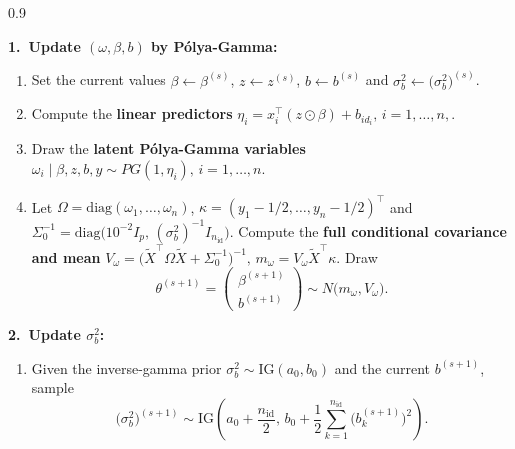 \documentclass[10pt,a4paper]{article}
\begin{document}
\begin{algobox}
\begingroup
\small
\begin{spacing}{0.9}

\noindent\textbf{1.\ Update $(\omega,\beta,b)$ by P\'olya-Gamma:}
\begin{enumerate}[itemsep=2pt, topsep=2pt, leftmargin=*]
  \item Set the current values
        $\beta \leftarrow \beta^{(s)}$,
        $z \leftarrow z^{(s)}$,
        $b \leftarrow b^{(s)}$ and
        $\sigma_b^2 \leftarrow \bigl(\sigma_b^2\bigr)^{(s)}$.
  \item Compute the \textbf{linear predictors} $\eta_i
      = x_i^\top (z \odot \beta) + b_{id_i},
      \, i=1,\dots,n,
    $.
  \item Draw the \textbf{latent P\'olya-Gamma variables} $\omega_i \mid \beta,z,b,y \sim PG(1, \eta_i), \, i=1,\dots,n.$
  \item Let $\Omega = \mathrm{diag}(\omega_1,\dots,\omega_n)$, $\kappa = (y_1 - 1/2,\dots,y_n - 1/2)^\top$ and $\Sigma_0^{-1}= \mathrm{diag}\!\bigl(
               10^{-2} I_p,\,
               (\sigma_b^2)^{-1} I_{n_{\mathrm{id}}}
            \bigr)$.
        Compute the \textbf{full conditional covariance and mean} $V_\omega
          = \bigl(\tilde X^\top \Omega \tilde X + \Sigma_0^{-1}\bigr)^{-1},
          \,
          m_\omega
          = V_\omega \tilde X^\top \kappa$. Draw
    \[
      \theta^{(s+1)} = 
      \begin{pmatrix}
        \beta^{(s+1)} \\
        b^{(s+1)}
      \end{pmatrix}
      \sim N\bigl(m_\omega, V_\omega\bigr).
    \]
\end{enumerate}

\medskip
\noindent\textbf{2.\ Update $\sigma_b^2$:}
\begin{enumerate}[itemsep=2pt, topsep=2pt, leftmargin=*]
  \item Given the inverse-gamma prior
        $\sigma_b^2 \sim \mathrm{IG}(a_0,b_0)$ and
        the current $b^{(s+1)}$, sample
        \[
          \bigl(\sigma_b^2\bigr)^{(s+1)}
          \sim \mathrm{IG}\!\left(
                 a_0 + \frac{n_{\mathrm{id}}}{2},\,
                 b_0 + \frac12 \sum_{k=1}^{n_{\mathrm{id}}}
                               \bigl(b_k^{(s+1)}\bigr)^2
               \right).
        \]
\end{enumerate}


\end{spacing}
\end{algobox}
\end{document}
